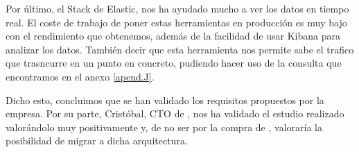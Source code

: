 Por último, el Stack de Elastic, nos ha ayudado mucho a ver los datos en tiempo real. El coste de trabajo de poner estas herramientas en producción es muy bajo con el rendimiento que obtenemos, además de la facilidad de usar Kibana para analizar los datos. También decir que esta herramienta nos permite sabe el trafico que trasncurre en un punto en concreto, pudiendo hacer uso de la consulta que encontramos en el anexo \ref{apend.J}. \par

Dicho esto, concluimos que se han validado los requisitos propuestos
por la empresa. Por su parte, Cristóbal, CTO de \mdata{}, nos ha
validado el estudio realizado valorándolo muy positivamente y, de no
ser por la compra de \vzconnect, valoraría la posibilidad de migrar a
dicha arquitectura.

